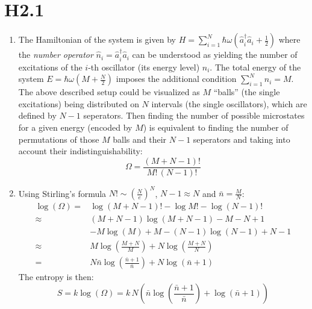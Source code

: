 \documentclass[11pt,a4paper]{scrartcl}
\newcommand{\hwnumber}{2}
\newcommand{\nbar}{\ensuremath{\bar{n}}}
\begin{document}
\section*{H\hwnumber.1}

\begin{enumerate}[label=\textbf{\large(\alph*)}, itemsep=2\baselineskip]

\item
    The Hamiltonian of the system is given by
    $
        H=\sum_{i=1}^{N}\hbar\omega\left(\hat{a}_{i}^{\dagger}\hat{a}_{i}+\frac{1}{2}\right)
    $
    where the \emph{number operator}
    $\hat{n}_{i}=\hat{a}_{i}^{\dagger}\hat{a}_{i}$ can be understood as
    yielding the number of excitations of the $i$-th oscillator (its energy
    level) $n_i$. The total energy of the system
    $E=\hbar\omega\left(M+\frac{N}{2}\right)$ imposes the additional condition
    $\sum_{i=1}^{N}n_i=M$. \\
    The above described setup could be visualized as $M$ \enquote{balls} (the
    single excitations) being distributed on $N$ intervals (the single
    oscillators), which are defined by $N-1$ seperators. Then finding the
    number of possible microstates for a given energy (encoded by $M$) is
    equivalent to finding the number of permutations of those $M$ balls and
    their $N-1$ seperators
    and
    taking into account their
    indistinguishability:
    \begin{equation*}
        \Omega = \frac{(M+N-1)!}{M!\,(N-1)!}
    \end{equation*}

\item
    Using Stirling's formula $N!\sim\left(\frac{N}{e}\right)^N$, $N-1\approx N$
    and $\nbar=\frac{M}{N}$:
    \begin{align*}
        \log(\Omega) =& \log(M+N-1)!-\log M!-\log(N-1)! \\
        \approx&
        (M+N-1)\log(M+N-1)-M-N+1\\&-M\log(M)+M-(N-1)\log(N-1)+N-1 \\
        \approx& M\log(\frac{M+N}{M})+N\log(\frac{M+N}{N}) \\
        =& N\nbar\log(\frac{\nbar+1}{\nbar})+N\log(\nbar+1)
    \end{align*}
    The entropy is then:
    \begin{equation*}
        S = k\log(\Omega)
        = k\,N\left(\nbar\log(\frac{\nbar+1}{\nbar})+\log(\nbar+1)\right)
    \end{equation*}


\end{enumerate}
\end{document}

